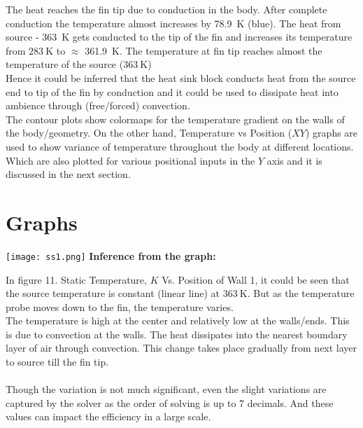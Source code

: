 \documentclass{article}
\begin{document}
The heat reaches the fin tip due to conduction in the body. After complete conduction the temperature almost increases by \SI{78.9}{\kelvin} (blue). The heat from source - \SI{363}{\kelvin} gets conducted to the tip of the fin and increases its temperature from $\SI{283}{\kelvin}$ to $\approx$ \SI{361.9}{\kelvin}. The temperature at fin tip reaches almost the temperature of the source ($\SI{363}{\kelvin}$) 
\vspace{1cm}\\
Hence it could be inferred that the heat sink block conducts heat from the source end to tip of the fin by conduction and it could be used to dissipate heat into ambience through (free/forced) convection. 
\vspace{1cm}\\
The contour plots show colormaps for the temperature gradient on the walls of the body/geometry. On the other hand, Temperature vs Position ($XY$) graphs are used to show variance of temperature throughout the body at different locations. Which are also plotted for various positional inputs in the $Y$ axis and it is discussed in the next section.
\section{Graphs}
\vspace{2cm}
\begin{center}
    \texttt{[image: ss1.png]}
    \vspace{2cm} 
    \textbf{Inference from the graph: }
\vspace{1cm}
\end{center}
In figure 11. Static Temperature, $K$ Vs. Position of Wall 1, it could be seen that the source temperature is constant (linear line) at $\SI{363}{\kelvin}$. But as the temperature probe moves down to the fin, the temperature varies. 
\vspace{1cm}\\
The temperature is high at the center and relatively low at the walls/ends. This is due to convection at the walls. The heat dissipates into the nearest boundary layer of air through convection. This change takes place gradually from next layer to source till the fin tip.\\
\vspace{1cm}\\
Though the variation is not much significant, even the slight variations are captured by the solver as the order of solving is up to 7 decimals. And these values can impact the efficiency in a large scale.  
\end{document}
